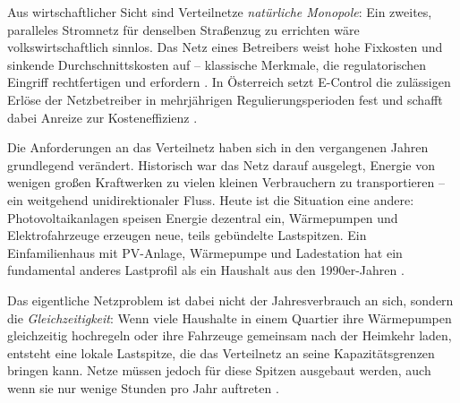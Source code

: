 Aus wirtschaftlicher Sicht sind Verteilnetze \textit{natürliche Monopole}: Ein zweites, paralleles Stromnetz für denselben Straßenzug zu errichten wäre volkswirtschaftlich sinnlos. Das Netz eines Betreibers weist hohe Fixkosten und sinkende Durchschnittskosten auf -- klassische Merkmale, die regulatorischen Eingriff rechtfertigen und erfordern \parencite{joskow2007, boiteux1960}. In Österreich setzt E-Control die zulässigen Erlöse der Netzbetreiber in mehrjährigen Regulierungsperioden fest und schafft dabei Anreize zur Kosteneffizienz \parencite{econtrolSystemnutzungsentgelte}.

Die Anforderungen an das Verteilnetz haben sich in den vergangenen Jahren grundlegend verändert. Historisch war das Netz darauf ausgelegt, Energie von wenigen großen Kraftwerken zu vielen kleinen Verbrauchern zu transportieren -- ein weitgehend unidirektionaler Fluss. Heute ist die Situation eine andere: Photovoltaikanlagen speisen Energie dezentral ein, Wärmepumpen und Elektrofahrzeuge erzeugen neue, teils gebündelte Lastspitzen. Ein Einfamilienhaus mit PV-Anlage, Wärmepumpe und Ladestation hat ein fundamental anderes Lastprofil als ein Haushalt aus den 1990er-Jahren \parencite{oesterreichsEnergie2023}.

Das eigentliche Netzproblem ist dabei nicht der Jahresverbrauch an sich, sondern die \textit{Gleichzeitigkeit}: Wenn viele Haushalte in einem Quartier ihre Wärmepumpen gleichzeitig hochregeln oder ihre Fahrzeuge gemeinsam nach der Heimkehr laden, entsteht eine lokale Lastspitze, die das Verteilnetz an seine Kapazitätsgrenzen bringen kann. Netze müssen jedoch für diese Spitzen ausgebaut werden, auch wenn sie nur wenige Stunden pro Jahr auftreten \parencite{borenstein2016, simshauser2016}.

